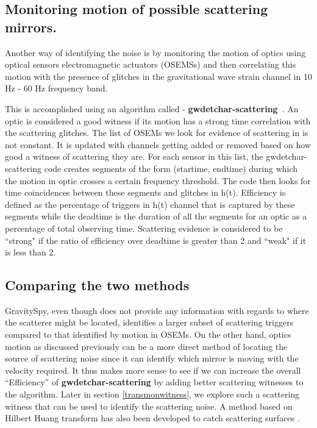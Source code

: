 \documentclass[12pt]{iopart}
\begin{document}
\subsection{Monitoring motion of possible scattering mirrors.}\label{osems}
Another way of identifying the noise is by monitoring the motion of optics using optical sensors electromagnetic actuators (OSEMSs) and then correlating this motion with the presence of glitches in the gravitational wave strain channel in 10 Hz - 60 Hz frequency band.

This is accomplished using an algorithm called - \textbf{gwdetchar-scattering}~\cite{alex_l_urban_2019_3526829}. An optic is considered a good witness if its motion has a strong time correlation with the scattering glitches. The list of OSEMs we look for evidence of scattering in is not constant. It is updated with channels getting added or removed based on how good a witness of scattering they are. For each sensor in this list, the gwdetchar-scattering code creates segments of the form (startime, endtime) during which the motion in optic crosses a certain frequency threshold.  The code then looks for time coincidences between these segments and glitches in h(t). Efficiency is defined as the percentage of triggers in h(t) channel that is captured by these segments while the deadtime is the duration of all the segments for an optic as a percentage of total observing time. Scattering evidence is considered to be ``strong" if the ratio of efficiency over deadtime is greater than 2 and ``weak" if it is less than 2. 

\subsection{Comparing the two methods}
GravitySpy, even though does not provide any information with regards to where the scatterer might be located, identifies a larger subset of scattering triggers compared to that identified by motion in OSEMs. On the other hand, optics motion as discussed previously can be a more direct method of locating the source of scattering noise since it can identify which mirror is moving with the velocity required. It thus makes more sense to see if we can increase the overall ``Efficiency'' of \textbf{gwdetchar-scattering} by adding better scattering witnesses to the algorithm. Later in section \ref{transmonwitness}, we explore such a scattering witness that can be used to identify the scattering noise. A method based on Hilbert Huang transform has also been developed to catch scattering surfaces \cite{hhtransform}. 
\end{document}
